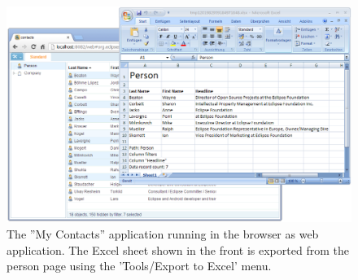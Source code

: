 \documentclass[a4paper,10pt,twoside]{book}
\begin{document}
\begin{figure}
\includegraphics[width=14cm]{my_contacts_rapweb_excelexport.png} 
\caption{The ''My Contacts'' application running in the browser as web application. 
The Excel sheet shown in the front is exported from the person page using the 'Tools/Export to Excel' menu. }
\end{figure}
\end{document}
